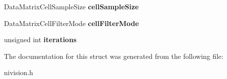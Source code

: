 \begin{DoxyCompactItemize}
\item 
\hypertarget{structDataMatrixReport__struct_af7015c5127508209e89a143bca731438}{
DataMatrixCellSampleSize {\bfseries cellSampleSize}}
\label{structDataMatrixReport__struct_af7015c5127508209e89a143bca731438}

\item 
\hypertarget{structDataMatrixReport__struct_a4cc3d30116ba9a020c5a87d8f02ecf53}{
DataMatrixCellFilterMode {\bfseries cellFilterMode}}
\label{structDataMatrixReport__struct_a4cc3d30116ba9a020c5a87d8f02ecf53}

\item 
\hypertarget{structDataMatrixReport__struct_ad21255de7dd17438b9148bddadf95059}{
unsigned int {\bfseries iterations}}
\label{structDataMatrixReport__struct_ad21255de7dd17438b9148bddadf95059}

\end{DoxyCompactItemize}


The documentation for this struct was generated from the following file:\begin{DoxyCompactItemize}
\item 
nivision.h\end{DoxyCompactItemize}
